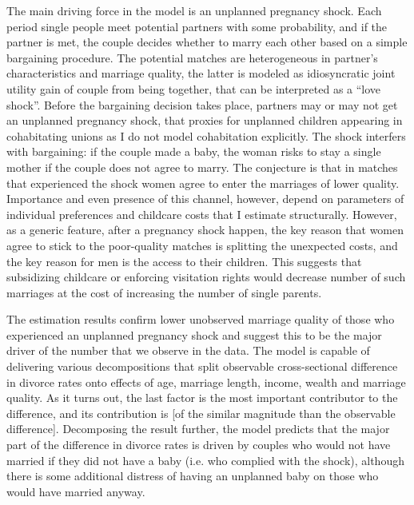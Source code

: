 \documentclass[12pt,letter]{article}
\begin{document}
The main driving force in the model is an unplanned pregnancy shock. Each period single people meet potential partners with some probability, and if the partner is met, the couple decides whether to marry each other based on a simple bargaining procedure. The potential matches are heterogeneous in partner's characteristics and marriage quality, the latter is modeled as idiosyncratic joint utility gain of couple from being together, that can be interpreted as a ``love shock''.  Before the bargaining decision takes place, partners may or may not get an unplanned pregnancy shock, that proxies for unplanned children appearing in cohabitating unions as I do not model cohabitation explicitly. The shock interfers with bargaining: if the couple made a baby, the woman risks to stay a single mother if the couple does not agree to marry. The conjecture is that in matches that experienced the shock women agree to enter the marriages of lower quality. Importance and even presence of this channel, however, depend on parameters of individual preferences and childcare costs that I estimate structurally. However, as a generic feature, after a pregnancy shock happen, the key reason that women agree to stick to the poor-quality matches is splitting the unexpected costs, and the key reason for men is the access to their children. This suggests that subsidizing childcare or enforcing visitation rights would decrease number of such marriages at the cost of increasing the number of single parents.

The estimation results confirm lower unobserved marriage quality of those who experienced an unplanned pregnancy shock and suggest this to be the major driver of the number that we observe in the data. The model is capable of delivering various decompositions that split observable cross-sectional difference in divorce rates onto effects of age, marriage length, income, wealth and marriage quality. As it turns out, the last factor is the most important contributor to the difference, and its contribution is [of the similar magnitude than the observable difference]. Decomposing the result further, the model predicts that the major part of the difference in divorce rates is driven by couples who would not have married if they did not have a baby (i.e. who complied with the shock), although there is some additional distress of having an unplanned baby on those who would have married anyway.
\end{document}

